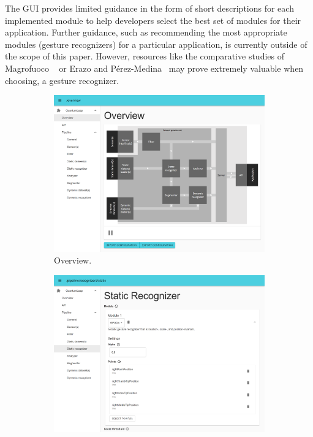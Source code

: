 The GUI provides limited guidance in the form of short descriptions for each implemented module to help developers select the best set of modules for their application. Further guidance, such as recommending the most appropriate modules (\eg gesture recognizers) for a particular application, is currently outside of the scope of this paper. 
However, resources like the comparative studies of Magrofuoco \etal~\cite{Magrofuoco:2021} or Erazo and P\'erez-Medina~\cite{Erazo:2020} may prove extremely valuable when choosing, \eg a gesture recognizer. 

\begin{figure}[ht]
    \centering
    \begin{subfigure}{.49\textwidth}
        \centering
        \includegraphics[width=\linewidth]{Figures/QuantumLeap/UI/overview.pdf}  
        \vspace{-15pt}
        \captionsetup{width=.9\linewidth}
        \caption{Overview.}
        \label{fig:quantumleap:ui:1}
    \end{subfigure}
    \begin{subfigure}{.49\textwidth}
        \centering
        \includegraphics[width=\linewidth]{Figures/QuantumLeap/UI/module-static_recognizer.pdf}  

\end{subfigure}
\end{figure}
